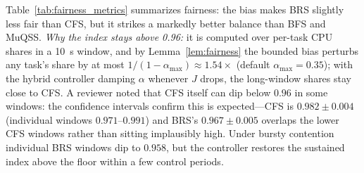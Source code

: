\begin{table}[t]
\centering
\caption{Fairness and starvation metrics, averaged across workloads. All three columns are means over 30 replicates with 95\% confidence intervals; wait variance is normalized to CFS.}
\label{tab:fairness_metrics}
\end{table}

Table~\ref{tab:fairness_metrics} summarizes fairness: the bias makes BRS slightly less fair than CFS, but it strikes a markedly better balance than BFS and MuQSS. \emph{Why the index stays above 0.96:} it is computed over per-task CPU shares in a \SI{10}{\second} window, and by Lemma~\ref{lem:fairness} the bounded bias perturbs any task's share by at most $1/(1-\alpha_{\max})\approx1.54\times$ (default $\alpha_{\max}=0.35$); with the hybrid controller damping $\alpha$ whenever $J$ drops, the long-window shares stay close to CFS. A reviewer noted that CFS itself can dip below $0.96$ in some windows: the confidence intervals confirm this is expected---CFS is $0.982\pm0.004$ (individual windows $0.971$--$0.991$) and BRS's $0.967\pm0.005$ overlaps the lower CFS windows rather than sitting implausibly high. Under bursty contention individual BRS windows dip to $0.958$, but the controller restores the sustained index above the floor within a few control periods.

